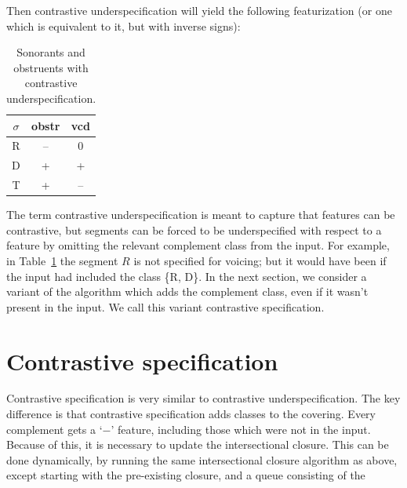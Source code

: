 \documentclass[11pt, oneside]{article}   	%
\begin{document}
Then contrastive underspecification will yield the following featurization (or one which is equivalent to it, but with inverse signs):

\begin{table}[h]
    \centering
    \begin{tabular} {|c||c|c|}
    \hline
        $\sigma$ & obstr & vcd \\ \hline
        R & -- & 0 \\
        D & + & + \\
        T & + & -- \\
        \hline
    \end{tabular}
    \caption{Sonorants and obstruents with contrastive underspecification.}
    \label{table:underspecification}
\end{table}

The term contrastive underspecification is meant to capture that features can be contrastive, but segments can be forced to be underspecified with respect to a feature by omitting the relevant complement class from the input. For example, in Table~\ref{table:underspecification} the segment $R$ is not specified for voicing; but it would have been if the input had included the class \{R, D\}. In the next section, we consider a variant of the algorithm which adds the complement class, even if it wasn't present in the input. We call this variant contrastive specification.
    

\section{Contrastive specification}

Contrastive specification is very similar to contrastive underspecification. The key difference is that contrastive specification adds classes to the covering. Every complement gets a `$-$' feature, including those which were not in the input. Because of this, it is necessary to update the intersectional closure. This can be done dynamically, by running the same intersectional closure algorithm as above, except starting with the pre-existing closure, and a queue consisting of the 
\end{document}
